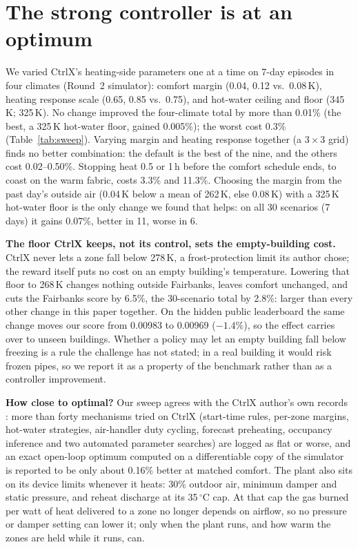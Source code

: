 \documentclass{article}
\begin{document}
\section{The strong controller is at an optimum}\label{sec:sweep}
We varied CtrlX's heating-side parameters one at a time on 7-day episodes in four climates (Round~2 simulator): comfort margin (0.04, 0.12 vs.\ 0.08\,K), heating response scale (0.65, 0.85 vs.\ 0.75), and hot-water ceiling and floor (345\,K; 325\,K). No change improved the four-climate total by more than 0.01\% (the best, a 325\,K hot-water floor, gained 0.005\%); the worst cost 0.3\% (Table~\ref{tab:sweep}). Varying margin and heating response together (a $3\times3$ grid) finds no better combination: the default is the best of the nine, and the others cost 0.02--0.50\%. Stopping heat 0.5 or 1\,h before the comfort schedule ends, to coast on the warm fabric, costs 3.3\% and 11.3\%. Choosing the margin from the past day's outside air (0.04\,K below a mean of 262\,K, else 0.08\,K) with a 325\,K hot-water floor is the only change we found that helps: on all 30 scenarios (7 days) it gains 0.07\%, better in 11, worse in 6.

\textbf{The floor CtrlX keeps, not its control, sets the empty-building cost.} CtrlX never lets a zone fall below 278\,K, a frost-protection limit its author chose; the reward itself puts no cost on an empty building's temperature. Lowering that floor to 268\,K changes nothing outside Fairbanks, leaves comfort unchanged, and cuts the Fairbanks score by 6.5\%, the 30-scenario total by 2.8\%: larger than every other change in this paper together. On the hidden public leaderboard the same change moves our score from 0.00983 to 0.00969 ($-1.4\%$), so the effect carries over to unseen buildings. Whether a policy may let an empty building fall below freezing is a rule the challenge has not stated; in a real building it would risk frozen pipes, so we report it as a property of the benchmark rather than as a controller improvement.

\textbf{How close to optimal?} Our sweep agrees with the CtrlX author's own records \cite{morev2026}: more than forty mechanisms tried on CtrlX (start-time rules, per-zone margins, hot-water strategies, air-handler duty cycling, forecast preheating, occupancy inference and two automated parameter searches) are logged as flat or worse, and an exact open-loop optimum computed on a differentiable copy of the simulator is reported to be only about 0.16\% better at matched comfort. The plant also sits on its device limits whenever it heats: 30\% outdoor air, minimum damper and static pressure, and reheat discharge at its 35\,$^\circ$C cap. At that cap the gas burned per watt of heat delivered to a zone no longer depends on airflow, so no pressure or damper setting can lower it; only when the plant runs, and how warm the zones are held while it runs, can.
\end{document}
